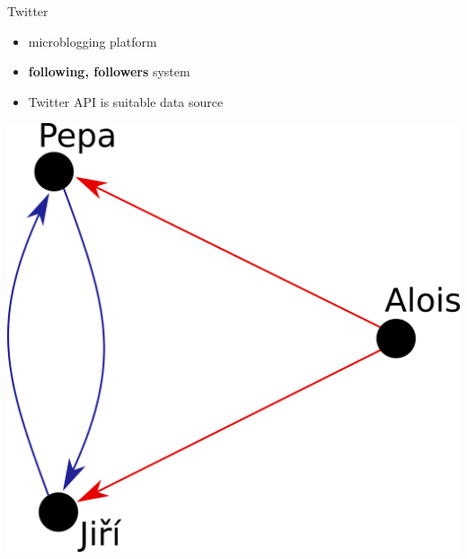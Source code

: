 \documentclass{beamer}
\begin{document}
\begin{frame}[fragile]
\begin{columns}[T]
\begin{column}{.63\textwidth}
\end{column}
\end{columns}








\begin{columns}[T]
\begin{column}{.33\textwidth}
    \begin{block}{Twitter}
    	\begin{itemize}
    		\item microblogging platform
            \item \textbf{following, followers} system
    		\item Twitter API is suitable data source
    	\end{itemize}
    	\center
    	\includegraphics[scale=0.55]{./Pics/pepa.png}
    \end{block}

\end{column}
\end{columns}
\end{frame}
\end{document}
